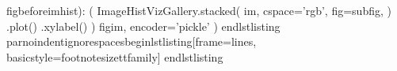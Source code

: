 {}
\markdownRendererSectionEnd \markdownRendererSectionBegin
{}\markdownRendererInterblockSeparator
{}figbeforeimhist): ( ImageHistVizGallery.stacked( im, cspace='rgb', fig=subfig, ) .plot() .xylabel() ) figim, encoder='pickle' ) \markdownRendererBackslash{}end\markdownRendererLeftBrace{}lstlisting\markdownRendererRightBrace{} \markdownRendererBackslash{}par\markdownRendererBackslash{}noindent\markdownRendererBackslash{}ignorespaces\markdownRendererBackslash{}begin\markdownRendererLeftBrace{}lstlisting\markdownRendererRightBrace{}[frame=lines, basicstyle=\markdownRendererBackslash{}footnotesize\markdownRendererBackslash{}ttfamily]\markdownRendererInterblockSeparator
{}\markdownRendererBackslash{}end\markdownRendererLeftBrace{}lstlisting\markdownRendererRightBrace{}
\markdownRendererSectionEnd \markdownRendererDocumentEnd